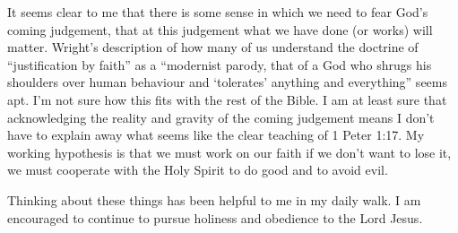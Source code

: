 It seems clear to me that there is some sense in which we need to fear God's
coming judgement, that at this judgement what we have done (or works) will
matter. Wright's description of how many of us understand the doctrine of
\enquote{justification by faith} as a \enquote{modernist parody, that of a God
who shrugs his shoulders over human behaviour and \enquote{tolerates} anything
and everything} seems apt. I'm not sure how this fits with the rest of the
Bible. I am at least sure that acknowledging the reality and gravity of the
coming judgement means I don't have to explain away what seems like the clear
teaching of 1 Peter 1:17. My working hypothesis is that we must work on our
faith if we don't want to lose it, we must cooperate with the Holy Spirit to do
good and to avoid evil.

Thinking about these things has been helpful to me in my daily walk. I am
encouraged to continue to pursue holiness and obedience to the Lord Jesus.


